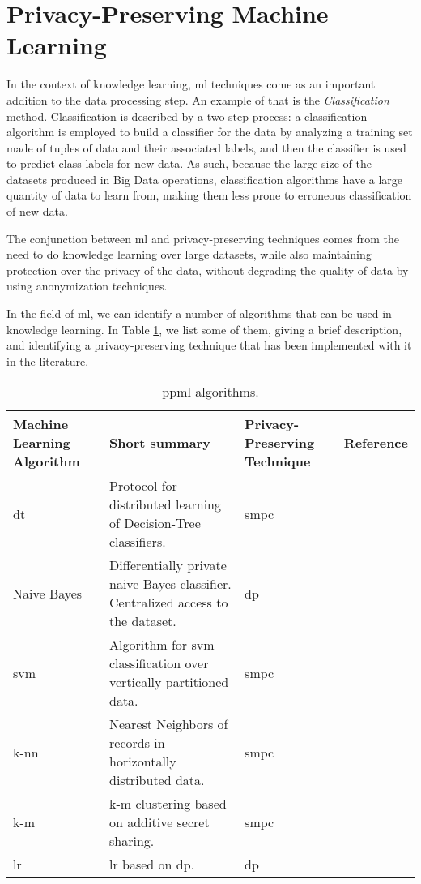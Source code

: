 \section{Privacy-Preserving Machine Learning}
\label{sec:PrivacyPreservingMachineLearning}


In the context of knowledge learning, \ac{ml} techniques come as an important addition to the data processing step. An example of that is the \textit{Classification} method. Classification is described by a two-step process: a classification algorithm is employed to build a classifier for the data by analyzing a training set made of tuples of data and their associated labels, and then the classifier is used to predict class labels for new data. As such, because the large size of the datasets produced in Big Data operations, classification algorithms have a large quantity of data to learn from, making them less prone to erroneous classification of new data.

The conjunction between \ac{ml} and privacy-preserving techniques comes from the need to do knowledge learning over large datasets, while also maintaining protection over the privacy of the data, without degrading the quality of data by using anonymization techniques.

In the field of \ac{ml}, we can identify a number of algorithms that can be used in knowledge learning. In Table \ref{table:ppml1}, we list some of them, giving a brief description, and identifying a privacy-preserving technique that has been implemented with it in the literature.

\begin{table}[htp]
\centering
\caption{\ac{ppml} algorithms.}
\label{table:ppml1}
\begin{tabular}{|p{2.3cm}|p{5cm}|p{3.7cm}|l|}
\hline
\textbf{Machine Learning Algorithm} & \textbf{Short summary} & \textbf{Privacy-Preserving Technique} 
& \textbf{Reference} \\ \hline
\acs{dt} & Protocol for distributed learning of Decision-Tree classifiers. & \ac{smpc} & \cite{brickell2009privacy} \\ \hline
Naive Bayes & Differentially private naive Bayes classifier. Centralized access to the dataset. & \ac{dp} &\cite{vaidya2013differentially} \\ \hline
\acs{svm}  &Algorithm for \acl{svm} classification over vertically partitioned data. & \ac{smpc} & \cite{yu2006privacy} \\ \hline
\acs{k-nn}  & Nearest Neighbors of records in horizontally distributed data. & \ac{smpc}  & \cite{shaneck2006privacy} \\ \hline
\acs{k-m} & \acl{k-m} clustering based on additive secret sharing. & \ac{smpc}  & \cite{doganay2008distributed} \\\hline
\acs{lr} & \acl{lr} based on \acl{dp}.    &  \ac{dp} & \cite{chaudhuri2009privacy} \\\hline
\end{tabular}
\end{table}


